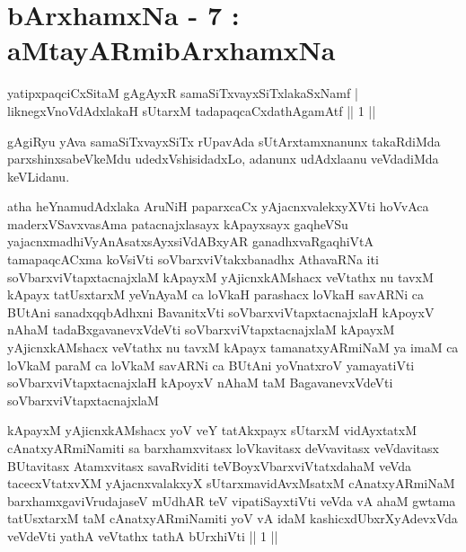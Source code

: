 
\chapter{bArxhamxNa - 7 : aMtayARmibArxhamxNa}

\begin{shl}
yatipxpaqciCxSitaM gAgAyxR samaSiTxvayxSiTxlakaSxNamf |\\
liknegxVnoVdAdxlakaH sUtarxM tadapaqcaCxdathA\s \s gamAtf \hfill || 1 ||
\end{shl}

\begin{artha}
gAgiRyu yAva samaSiTxvayxSiTx rUpavAda sUtArxtamxnanunx takaRdiMda parxshinxsabeVkeMdu udedxVshisidadxLo, adanunx udAdxlaanu veVdadiMda keVLidanu.
\end{artha}


\begin{kandikeshl}
atha heYnamudAdxlaka AruNiH paparxcaCx yAjacnxvalekxyXVti hoVvAca maderxVSavxvasAma patacnajxlasayx kApayxsayx gaqheVSu yajacnxmadhiVyAnAsatxsAyxsiVdABxyAR ganadhxvaRgaqhiVtA tamapaqcACxma koV\s siVti soV\s barxviVtakxbanadhx AthavaRNa iti soV\s barxviVtapxtacnajxlaM kApayxM yAjicnxkAMshacx veVtathx nu tavxM kApayx tatUsxtarxM yeVnAyaM ca loVkaH parashacx loVkaH savARNi ca BUtAni sanadxqqbAdhxni BavanitxVti soV\s barxviVtapxtacnajxlaH kApoyxV nAhaM tadaBxgavanevxVdeVti soV\s barxviVtapxtacnajxlaM kApayxM yAjicnxkAMshacx veVtathx nu tavxM kApayx tamanatxyARmiNaM ya imaM ca loVkaM paraM ca loVkaM savARNi ca BUtAni yoV\s natxroV yamayatiVti soV\s barxviVtapxtacnajxlaH kApoyxV nAhaM taM BagavanevxVdeVti soV\s barxviVtapxtacnajxlaM 
\end{kandikeshl}

\begin{kandikeshl}
kApayxM yAjicnxkAMshacx yoV veY tatAkxpayx sUtarxM vidAyxtatxM cAnatxyARmiNamiti sa barxhamxvitasx loVkavitasx deVvavitasx veVdavitasx BUtavitasx Atamxvitasx savaRviditi teVBoyxV\s barxviVtatxdahaM veVda tacecxVtatxvXM yAjacnxvalakxyX sUtarxmavidAvxMsatxM cAnatxyARmiNaM barxhamxgaviVrudajaseV mUdhAR teV vipatiSayxtiVti veVda vA ahaM gwtama tatUsxtarxM taM cAnatxyARmiNamiti yoV vA idaM kashicxdUbxrXyAdevxVda veVdeVti yathA veVtathx tathA bUrxhiVti || 1 ||
\end{kandikeshl}

